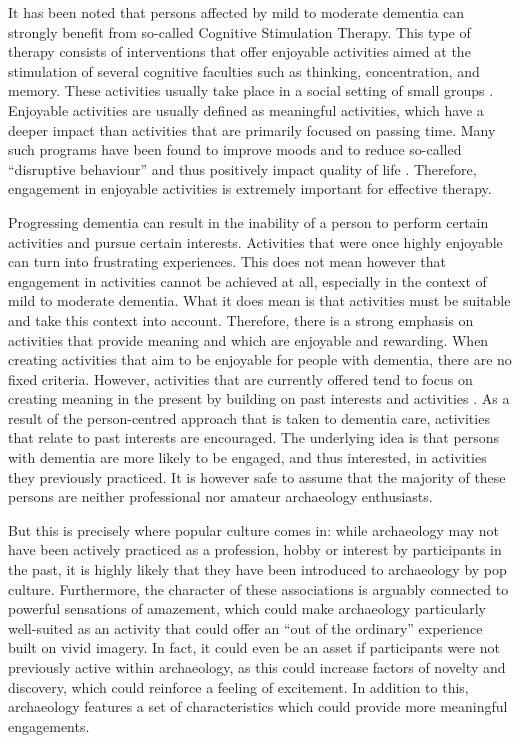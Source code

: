 	
	It has been noted that persons affected by mild to moderate dementia can strongly benefit from so-called Cognitive Stimulation Therapy. This type of therapy consists of interventions that offer enjoyable activities aimed at the stimulation of several cognitive faculties such as thinking, concentration, and memory. These activities usually take place in a social setting of small groups \parencite{Woods_2012}. Enjoyable activities are usually defined as meaningful activities, which have a deeper impact than activities that are primarily focused on passing time. Many such programs have been found to improve moods and to reduce so-called “disruptive behaviour” and thus positively impact quality of life \parencite[124]{Teri_1992}. Therefore, engagement in enjoyable activities is extremely important for effective therapy. 
	
	Progressing dementia can result in the inability of a person to perform certain activities and pursue certain interests. Activities that were once highly enjoyable can turn into frustrating experiences. This does not mean however that engagement in activities cannot be achieved at all, especially in the context of mild to moderate dementia. What it does mean is that activities must be suitable and take this context into account. Therefore, there is a strong emphasis on activities that provide meaning and which are enjoyable and rewarding. When creating activities that aim to be enjoyable for people with dementia, there are no fixed criteria. However, activities that are currently offered tend to focus on creating meaning in the present by building on past interests and activities \parencite{Association_2015}. As a result of the person-centred approach that is taken to dementia care, activities that relate to past interests are encouraged. The underlying idea is that persons with dementia are more likely to be engaged, and thus interested, in activities they previously practiced. It is however safe to assume that the majority of these persons are neither professional nor amateur archaeology enthusiasts. 		
	
	But this is precisely where popular culture comes in: while archaeology may not have been actively practiced as a profession, hobby or interest by participants in the past, it is highly likely that they have been introduced to archaeology by pop culture. Furthermore, the character of these associations is arguably connected to powerful sensations of amazement, which could make archaeology particularly well-suited as an activity that could offer an “out of the ordinary” experience built on vivid imagery. In fact, it could even be an asset if participants were not previously active within archaeology, as this could increase factors of novelty and discovery, which could reinforce a feeling of excitement. In addition to this, archaeology features a set of characteristics which could provide more meaningful engagements. 	
	
